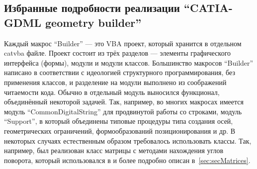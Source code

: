 
\subsection{Избранные подробности реализации ``CATIA-GDML geometry builder''}\label{sec:secImplDetails}

Каждый макрос ``Builder'' --- это VBA проект, который хранится в отдельном catvba файле. Проект состоит из трёх разделов --- элементы графического интерфейса (формы), модули и модули классов. Большинство макросов ``Builder'' написано в соответствии с идеологией структурного программирования, без применения классов, и разделение на модули выполнено из соображений читаемости кода. Обычно в отдельный модуль выносился функционал, объединённый некоторой задачей. Так, например, во многих макросах имеется модуль ``CommonDigitalString'' для продвинутой работы со строками, модуль ``Support'', в который объединены типовые процедуры типа создания осей, геометрических ограничений, формообразований позиционирования и др. В некоторых случаях естественным образом требовалось использовать классы. Так, например, был реализован класс матрицы с методами нахождения углов поворота, который использовался в \todo и более подробно описан в~\ref{sec:secMatrices}.

%                                                                    

